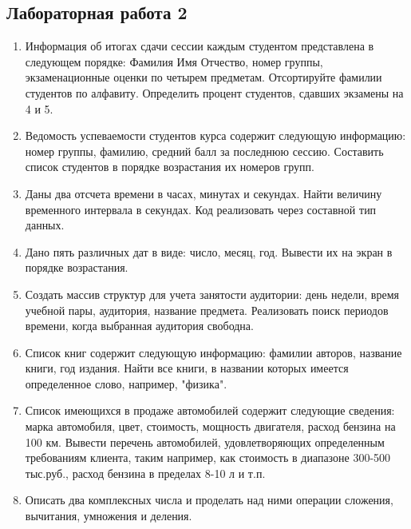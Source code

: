 \subsection{Лабораторная работа 2}
\begin{enumerate}[leftmargin=*]
    \item Информация об итогах сдачи сессии каждым студентом представлена в следующем порядке: Фамилия Имя Отчество, номер группы, экзаменационные оценки по четырем предметам. 
    Отсортируйте фамилии студентов по алфавиту. Определить процент студентов, сдавших экзамены на 4 и 5.
    \item Ведомость успеваемости студентов курса содержит следующую информацию: номер группы, фамилию, средний балл за последнюю сессию. Составить список студентов в порядке возрастания их номеров групп.
    \item Даны два отсчета времени в часах, минутах и секундах. Найти величину временного интервала в секундах. Код реализовать через составной тип данных.
    \item Дано пять различных дат в виде: число, месяц, год. Вывести их на экран в порядке возрастания.
    \item Создать массив структур для учета занятости аудитории: день недели, время учебной пары, аудитория, название предмета. Реализовать поиск периодов времени, когда выбранная аудитория свободна.
    \item Список книг содержит следующую информацию: фамилии авторов, название книги, год издания. Найти все книги, в названии которых имеется определенное слово, например, "физика".
    \item Список имеющихся в продаже автомобилей содержит следующие сведения: марка автомобиля, цвет, стоимость, мощность двигателя, расход бензина на 100 км. Вывести перечень автомобилей, удовлетворяющих определенным требованиям клиента, таким например, как стоимость в диапазоне 300-500 тыс.руб., расход бензина в пределах 8-10 л и т.п.
    \item Описать два комплексных числа и проделать над ними операции сложения, вычитания, умножения и деления.
\end{enumerate}
